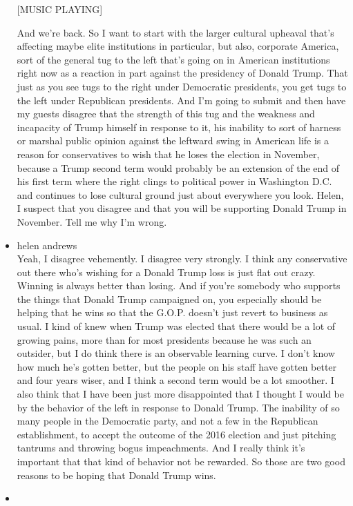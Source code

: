 \begin{itemize}
  {[}MUSIC PLAYING{]}

  And we're back. So I want to start with the larger cultural upheaval
  that's affecting maybe elite institutions in particular, but also,
  corporate America, sort of the general tug to the left that's going on
  in American institutions right now as a reaction in part against the
  presidency of Donald Trump. That just as you see tugs to the right
  under Democratic presidents, you get tugs to the left under Republican
  presidents. And I'm going to submit and then have my guests disagree
  that the strength of this tug and the weakness and incapacity of Trump
  himself in response to it, his inability to sort of harness or marshal
  public opinion against the leftward swing in American life is a reason
  for conservatives to wish that he loses the election in November,
  because a Trump second term would probably be an extension of the end
  of his first term where the right clings to political power in
  Washington D.C. and continues to lose cultural ground just about
  everywhere you look. Helen, I suspect that you disagree and that you
  will be supporting Donald Trump in November. Tell me why I'm wrong.
\item
  helen andrews\\
  Yeah, I disagree vehemently. I disagree very strongly. I think any
  conservative out there who's wishing for a Donald Trump loss is just
  flat out crazy. Winning is always better than losing. And if you're
  somebody who supports the things that Donald Trump campaigned on, you
  especially should be helping that he wins so that the G.O.P. doesn't
  just revert to business as usual. I kind of knew when Trump was
  elected that there would be a lot of growing pains, more than for most
  presidents because he was such an outsider, but I do think there is an
  observable learning curve. I don't know how much he's gotten better,
  but the people on his staff have gotten better and four years wiser,
  and I think a second term would be a lot smoother. I also think that I
  have been just more disappointed that I thought I would be by the
  behavior of the left in response to Donald Trump. The inability of so
  many people in the Democratic party, and not a few in the Republican
  establishment, to accept the outcome of the 2016 election and just
  pitching tantrums and throwing bogus impeachments. And I really think
  it's important that that kind of behavior not be rewarded. So those
  are two good reasons to be hoping that Donald Trump wins.
\item

\end{itemize}
